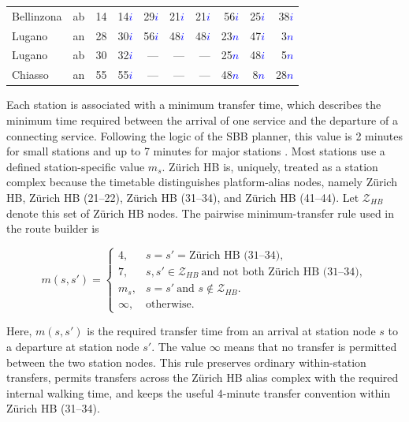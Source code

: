 \documentclass[preprint,12pt]{elsarticle}
\begin{document}
\begin{table}[htbp]
{\begin{tabular}{llrrrrrrrr}
Bellinzona       & ab & 14 & 14\textcolor{blue}{$i$} & 29\textcolor{blue}{$i$} & 21\textcolor{blue}{$i$} & 21\textcolor{blue}{$i$} & 56\textcolor{blue}{$i$} & 25\textcolor{blue}{$i$} & 38\textcolor{blue}{$i$} \\
Lugano           & an & 28 & 30\textcolor{blue}{$i$} & 56\textcolor{blue}{$i$} & 48\textcolor{blue}{$i$} & 48\textcolor{blue}{$i$} & 23\textcolor{blue}{$n$} & 47\textcolor{blue}{$i$} & 3\textcolor{blue}{$n$} \\
Lugano           & ab & 30 & 32\textcolor{blue}{$i$} & --- & --- & --- & 25\textcolor{blue}{$n$} & 48\textcolor{blue}{$i$} & 5\textcolor{blue}{$n$} \\
Chiasso          & an & 55 & 55\textcolor{blue}{$i$} & --- & --- & --- & 48\textcolor{blue}{$n$} & 8\textcolor{blue}{$n$} & 28\textcolor{blue}{$n$} \\
\bottomrule
\end{tabular}%
}
\end{table}

\newpage
Each station is associated with a minimum transfer time, which describes the minimum time required between the arrival of one service and the departure of a connecting service. Following the logic of the SBB planner, this value is 2 minutes for small stations and up to 7 minutes for major stations \citep{SBB_Planner}. Most stations use a defined station-specific value \(m_s\). Zürich HB is, uniquely, treated as a station complex because the timetable distinguishes platform-alias nodes, namely Zürich HB, Zürich HB (21--22), Zürich HB (31--34), and Zürich HB (41--44). Let \(\mathcal{Z}_{HB}\) denote this set of Zürich HB nodes. The pairwise minimum-transfer rule used in the route builder is

\begin{equation}
m(s,s')=
\begin{cases}
4, & s=s'=\text{Zürich HB (31--34)},\\
7, & s,s'\in\mathcal{Z}_{HB}\ \text{and not both } \text{Zürich HB (31--34)},\\
m_s, & s=s'\ \text{and }s\notin\mathcal{Z}_{HB}.\\
\infty, & \text{otherwise}.
\end{cases}
\label{eq:data-transfer-time-rule}
\end{equation}

Here, \(m(s,s')\) is the required transfer time from an arrival at station node \(s\) to a departure at station node \(s'\). The value \(\infty\) means that no transfer is permitted between the two station nodes. This rule preserves ordinary within-station transfers, permits transfers across the Zürich HB alias complex with the required internal walking time, and keeps the useful 4-minute transfer convention within Zürich HB (31--34).
\end{document}
